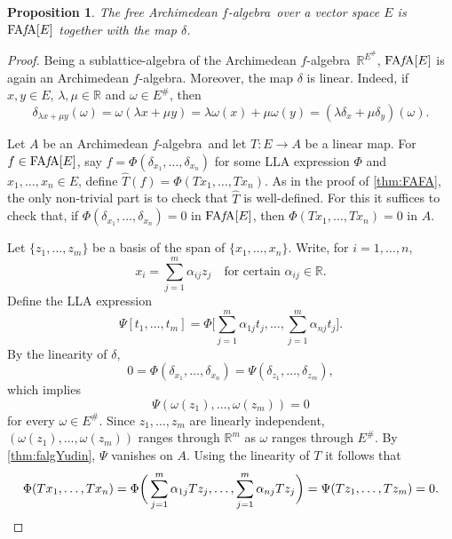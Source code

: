 \documentclass{memo-l}
\newtheorem{prop}[theorem]{Proposition}
\theoremstyle{definition}
\theoremstyle{remark}
\numberwithin{section}{chapter}
\numberwithin{equation}{chapter}
\newcommand\R{\ensuremath{\mathbb{R}}}
\newcommand{\falg}{$f\!$-algebra}
\newcommand{\FAFAv}[1]{\operatorname{FA{\it f}\!A}[#1]}
\begin{document}
\begin{prop}\label{prop:fafav}
    The free Archimedean \falg\ over a vector space $E$ is $\FAFAv E$
    together with the map $\delta $.
\end{prop}
\begin{proof}
    Being a sublattice-algebra of the Archimedean \falg\
    $\R^{E^{\#}}$, $\FAFAv E$ is again an Archimedean \falg.
    Moreover, the map $\delta $ is linear. Indeed, if $x,y
    \in E$, $\lambda ,\mu \in \R$ and $\omega \in E^{\#}$, then
    \[
    \delta _{\lambda x+\mu y}(\omega )=\omega (\lambda x+\mu
    y)=\lambda \omega (x)+\mu \omega (y)=(\lambda \delta _x+\mu \delta
    _y)(\omega ).
    \]

    Let $A$ be an Archimedean \falg\ and let $T\colon E\to A$ be a
    linear map. For $f \in \FAFAv E$, say $f=\Phi (\delta
    _{x_1},\ldots ,\delta _{x_n})$ for some LLA expression $\Phi $ and
    $x_1,\ldots ,x_n \in E$, define $\hat{T}(f)=\Phi (Tx_1,\ldots,
    Tx_n)$. As in the proof of \cref{thm:FAFA}, the only non-trivial
    part is to check that $\hat{T}$ is well-defined. For this it
    suffices to check that, if
    $\Phi (\delta _{x_1},\ldots ,\delta _{x_n})=0$ in $\FAFAv E$, then
    $\Phi (Tx_1,\ldots ,Tx_n)=0$ in $A$.

    Let $\{z_1,\ldots ,z_m\}$ be a basis of the span of $\{x_1,\ldots
    ,x_n\}$. Write, for $i=1,\ldots ,n$,
    \[
    x_i=\sum_{j=1}^{m} \alpha _{ij} z_j\quad\text{for certain }\alpha
    _{ij}\in \R.
    \]
    Define the LLA expression
    \[
        \Psi [t_1,\ldots ,t_m]=\Phi \bigg[\sum_{j=1}^{m}\alpha
        _{1j}t_j,\ldots ,\sum_{j=1}^{m}\alpha _{nj}t_j\bigg].
    \]
    By the linearity of $\delta $,
    \[
        0=\Phi (\delta _{x_1},\ldots ,\delta _{x_n})=\Psi (\delta
        _{z_1},\ldots ,\delta _{z_m}),
    \]
    which implies
    \[
    \Psi (\omega (z_1),\ldots ,\omega (z_m))=0
    \]
    for every $\omega \in E^{\#}$. Since $z_1,\ldots ,z_m$ are
    linearly independent, $(\omega (z_1),\ldots ,\omega (z_m))$ ranges
    through $\R^{m}$ as $\omega$ ranges through $E^{\#}$. By \cref{thm:falgYudin},
    $\Psi $ vanishes on $A$. Using the linearity of $T$ it follows
    that
    \[
    \Phi (Tx_1,\ldots ,Tx_n)=\Phi \bigg(\sum_{j=1}^{m}\alpha
    _{1j}Tz_j,\ldots ,\sum_{j=1}^{m}\alpha _{nj}Tz_j\bigg)=\Psi
    (Tz_1,\ldots ,Tz_m)=0.\qedhere
    \]
\end{proof}
\end{document}
